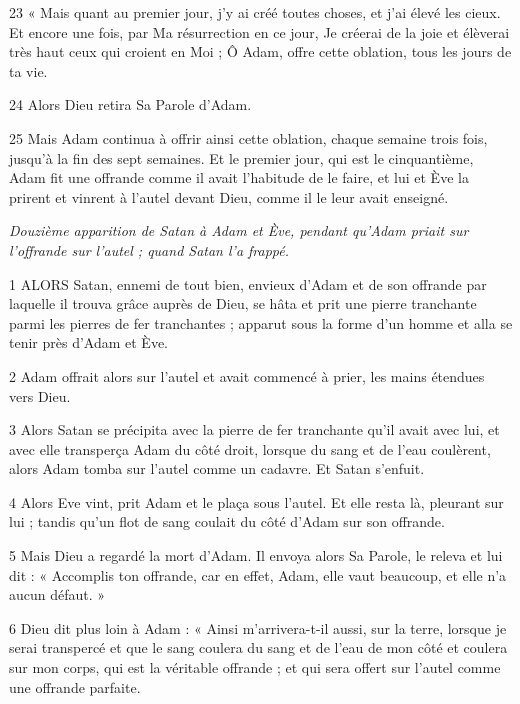 \par 23 « Mais quant au premier jour, j'y ai créé toutes choses, et j'ai élevé les cieux. Et encore une fois, par Ma résurrection en ce jour, Je créerai de la joie et élèverai très haut ceux qui croient en Moi ; Ô Adam, offre cette oblation, tous les jours de ta vie.

\par 24 Alors Dieu retira Sa Parole d'Adam.

\par 25 Mais Adam continua à offrir ainsi cette oblation, chaque semaine trois fois, jusqu'à la fin des sept semaines. Et le premier jour, qui est le cinquantième, Adam fit une offrande comme il avait l'habitude de le faire, et lui et Ève la prirent et vinrent à l'autel devant Dieu, comme il le leur avait enseigné.




\par \textit{Douzième apparition de Satan à Adam et Ève, pendant qu'Adam priait sur l'offrande sur l'autel ; quand Satan l'a frappé.}

\par 1 ALORS Satan, ennemi de tout bien, envieux d'Adam et de son offrande par laquelle il trouva grâce auprès de Dieu, se hâta et prit une pierre tranchante parmi les pierres de fer tranchantes ; apparut sous la forme d'un homme et alla se tenir près d'Adam et Ève.

\par 2 Adam offrait alors sur l'autel et avait commencé à prier, les mains étendues vers Dieu.

\par 3 Alors Satan se précipita avec la pierre de fer tranchante qu'il avait avec lui, et avec elle transperça Adam du côté droit, lorsque du sang et de l'eau coulèrent, alors Adam tomba sur l'autel comme un cadavre. Et Satan s'enfuit.

\par 4 Alors Eve vint, prit Adam et le plaça sous l'autel. Et elle resta là, pleurant sur lui ; tandis qu'un flot de sang coulait du côté d'Adam sur son offrande.

\par 5 Mais Dieu a regardé la mort d'Adam. Il envoya alors Sa Parole, le releva et lui dit : « Accomplis ton offrande, car en effet, Adam, elle vaut beaucoup, et elle n'a aucun défaut. »

\par 6 Dieu dit plus loin à Adam : « Ainsi m'arrivera-t-il aussi, sur la terre, lorsque je serai transpercé et que le sang coulera du sang et de l'eau de mon côté et coulera sur mon corps, qui est la véritable offrande ; et qui sera offert sur l’autel comme une offrande parfaite.

